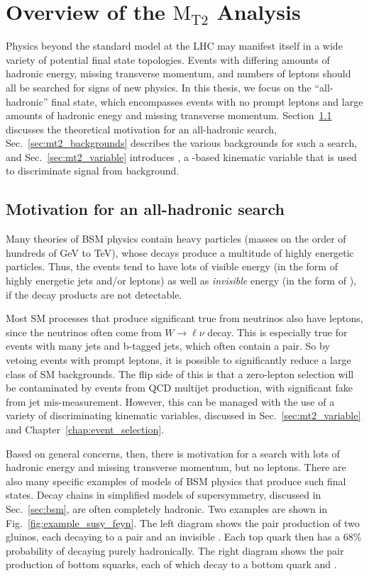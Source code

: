 \chapter{Overview of the \texorpdfstring{$\text{M}_\text{T2}$}{MT2} Analysis}

Physics beyond the standard model at the LHC may manifest itself in a wide variety of potential final state 
topologies. Events with differing amounts of hadronic energy, missing transverse momentum, and numbers of leptons
should all be searched for signs of new physics. In this thesis, we focus on the ``all-hadronic'' final state,
which encompasses events with no prompt leptons and large amounts of hadronic enegy and missing transverse momentum.
Section~\ref{sec:motivation} discusses the theoretical motivation for an all-hadronic search, Sec.~\ref{sec:mt2_backgrounds}
describes the various backgrounds for such a search, and Sec.~\ref{sec:mt2_variable} introduces \mttwo, a \ptmiss-based kinematic
variable that is used to discriminate signal from background.

\section{Motivation for an all-hadronic search}
\label{sec:motivation}

Many theories of BSM physics contain heavy particles (masses on the order of hundreds of GeV to TeV), whose
decays produce a multitude of highly energetic particles. Thus, the events tend to have lots of visible
energy (in the form of highly energetic jets and/or leptons) as well as
\emph{invisible} energy (in the form of \ptmiss), if the decay products are not detectable.

Most SM processes that produce significant true \ptmiss from neutrinos also have leptons, since the
neutrinos often come from $W\to\ell\nu$ decay. This is especially true for events with many jets
and b-tagged jets, which often contain a \ttbar pair. So by vetoing events with prompt leptons, it is
possible to significantly reduce a large class of SM backgrounds. The flip side of this is that a
zero-lepton selection will be contaminated by events from QCD multijet production, with significant
fake \ptmiss from jet mis-measurement. However, this can be managed with the use of a variety of
discriminating kinematic variables, discussed in Sec.~\ref{sec:mt2_variable} and Chapter~\ref{chap:event_selection}.

Based on general concerns, then, there is motivation for a search with lots of hadronic energy and
missing transverse momentum, but no leptons. There are also many specific examples of models
of BSM physics that produce such final states. Decay chains in simplified models of supersymmetry, discussed in
Sec.~\ref{sec:bsm}, are often completely hadronic. Two examples are shown in Fig.~\ref{fig:example_susy_feyn}.
The left diagram shows the pair production of two gluinos, each decaying to a \ttbar pair and an invisible \lsp.
Each top quark then has a 68\% probability of decaying purely hadronically. The right diagram shows
the pair production of bottom squarks, each of which decay to a bottom quark and \lsp.

